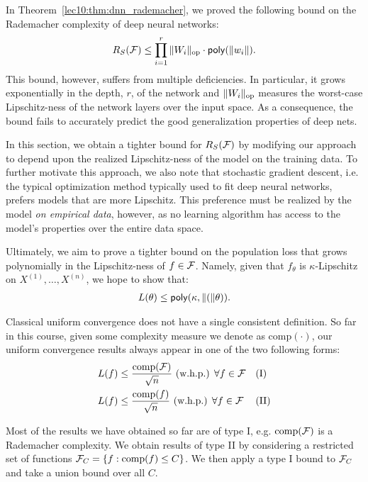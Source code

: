 \label{sec:deep_nets_data_dependent}

In Theorem~\ref{lec10:thm:dnn_rademacher}, we proved the following bound on the Rademacher complexity of deep neural networks:
\begin{align}
    R_S(\mathcal F) \leq \prod_{i = 1}^r \|W_i\|_{\text{op}} \cdot \mathsf{poly}(\|w_i\|).
\end{align}
This bound, however, suffers from multiple deficiencies. In particular, it grows exponentially in the depth, $r$, of the network and $\|W_i\|_{\text{op}}$ measures the worst-case Lipschitz-ness of the network layers over the input space. As a consequence, the bound fails to accurately predict the good generalization properties of deep nets.

In this section, we obtain a tighter bound for $R_S(\mathcal F)$ by modifying our approach to depend upon the realized Lipschitz-ness of the model on the training data. To further motivate this approach, we also note that stochastic gradient descent, i.e. the typical optimization method typically used to fit deep neural networks, prefers models that are more Lipschitz. This preference must be realized by the model \emph{on empirical data}, however, as no learning algorithm has access to the model's properties over the entire data space.

Ultimately, we aim to prove a tighter bound on the population loss that grows polynomially in the Lipschitz-ness of $f \in \mathcal F$. Namely, given that $f_\theta$ is $\kappa$-Lipschitz on $X^{(1)},\dots,X^{(n)}$, we hope to show that:
\begin{align}
    L(\theta) \leq \mathsf{poly} (\kappa, \|(\|\theta)).
\end{align}

Classical uniform convergence does not have a single consistent definition. So far in this course, given some complexity measure we denote as $\text{comp}(\cdot)$, our uniform convergence results always appear in one of the two following forms: 
\begin{align}
    L(f) &\leq \frac{\text{comp}(\mathcal F)}{\sqrt{n}} \text{ (w.h.p.) $\forall f \in \mathcal F$} &&\text{(I)} \\
    L(f) &\leq \frac{\text{comp}(f)}{\sqrt{n}} \text{ (w.h.p.) $\forall f \in \mathcal F$} &&\text{(II)}
\end{align}

\begin{remark}
    Most of the results we have obtained so far are of type I, e.g. $\text{comp}(\mathcal F)$ is a Rademacher complexity. We obtain results of type II by considering a restricted set of functions $\mathcal F_C = \{f : \text{comp}(f) \leq C\}$. We then apply a type I bound to $\mathcal F_C$ and take a union bound over all $C$.
\end{remark}

